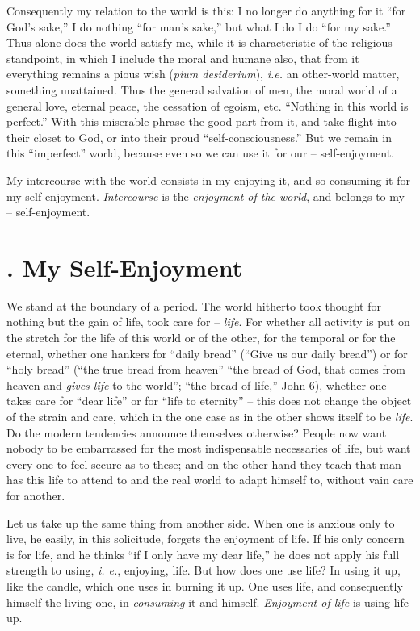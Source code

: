 \documentclass[12pt,a4paper]{book}
\begin{document}
Consequently my relation to the world is this: I no longer do anything for it 
``for God's sake,'' I do nothing ``for man's sake,'' but what I do I do 
``for my sake.'' Thus alone does the world satisfy me, while it is 
characteristic of the religious standpoint, in which I include the moral and 
humane also, that from it everything remains a pious wish (\textit{pium 
desiderium}), \textit{i.e.} an other-world matter, something unattained. Thus 
the general salvation of men, the moral world of a general love, eternal 
peace, the cessation of egoism, etc. ``Nothing in this world is perfect.'' 
With this miserable phrase the good part from it, and take flight into their 
closet to God, or into their proud ``self-consciousness.'' But we remain in 
this ``imperfect'' world, because even so we can use it for our -- 
self-enjoyment.

My intercourse with the world consists in my enjoying it, and so consuming it 
for my self-enjoyment. \textit{Intercourse} is the \textit{enjoyment of the 
world}, and belongs to my -- self-enjoyment.

\section[3. My Self-Enjoyment]{. My Self-Enjoyment}

We stand at the boundary of a period. The world hitherto took thought for 
nothing but the gain of life, took care for -- \textit{life}. For whether all 
activity is put on the stretch for the life of this world or of the other, for 
the temporal or for the eternal, whether one hankers for ``daily bread'' 
(``Give us our daily bread'') or for ``holy bread'' (``the true bread 
from heaven'' ``the bread of God, that comes from heaven and \textit{gives 
life} to the world''; ``the bread of life,'' John 6), whether one takes 
care for ``dear life'' or for ``life to eternity'' -- this does not change 
the object of the strain and care, which in the one case as in the other shows 
itself to be \textit{life}. Do the modern tendencies announce themselves 
otherwise? People now want nobody to be embarrassed for the most indispensable 
necessaries of life, but want every one to feel secure as to these; and on the 
other hand they teach that man has this life to attend to and the real world 
to adapt himself to, without vain care for another.

Let us take up the same thing from another side. When one is anxious only to 
live, he easily, in this solicitude, forgets the enjoyment of life. If his 
only concern is for life, and he thinks ``if I only have my dear life,'' he 
does not apply his full strength to using, \textit{i. e.}, enjoying, life. But 
how does one use life? In using it up, like the candle, which one uses in 
burning it up. One uses life, and consequently himself the living one, in 
\textit{consuming} it and himself. \textit{Enjoyment of life} is using life 
up.
\end{document}
